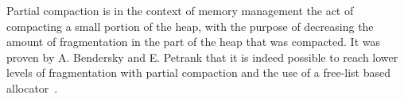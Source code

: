 

Partial compaction is in the context of memory management the act of compacting a small portion of the heap, with the purpose of decreasing the amount of fragmentation in the part of the heap that was compacted. It was proven by A. Bendersky and E. Petrank that it is indeed possible to reach lower levels of fragmentation with partial compaction and the use of a free-list based allocator~\cite{https://dl-acm-org.ezproxy.its.uu.se/doi/pdf/10.1145/1925844.1926441}. 